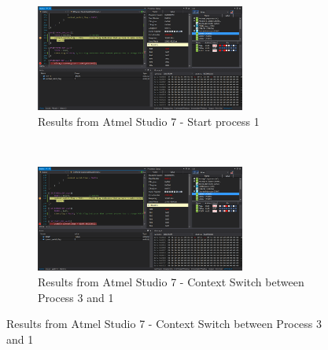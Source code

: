 \documentclass{article}
\begin{document}
	\begin{figure}[h!]
	\centering
	\begin{subfigure}[t]{0.5\textwidth}
		\centering
		\includegraphics[height=3.5cm,width=\linewidth]{./results/lab8_sim_s1_cs_3_1.png}
		\caption{Results from Αtmel Studio 7 - Start process 1 }
	\end{subfigure}%
	~
	\begin{subfigure}[t]{0.5\textwidth}
		\centering
		\includegraphics[height=3.5cm,width=\linewidth]{./results/lab8_sim_s1_cs_1_3.png}
		\caption{Results from Αtmel Studio 7 - Context Switch between Process 3 and 1}
	\end{subfigure}
\end{figure}
\end{document}
